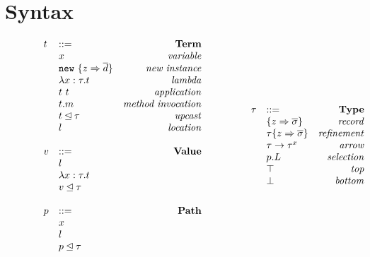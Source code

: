 \documentclass{llncs}
\numberwithin{subcase}{case}
\numberwithin{case}{theorem}
\numberwithin{case}{lemma}
\begin{document}
\section{Syntax}

\begin{figure}[h]
\[
\begin{array}{lllll}
\begin{array}{llr}
t 		& ::= 														&\text{\bf{Term}} \\
		& x 														&\text{\emph{variable}}\\
		& \texttt{new} \ \{z \Rightarrow \overline{d}\}	&\text{\emph{new instance}}\\
		& \lambda x:\tau.t 										&\text{\emph{lambda}}\\
		& t\ t 													&\text{\emph{application}}\\
		& t.m 														&\text{\emph{method invocation}}\\
		& t \unlhd \tau 										&\text{\emph{upcast}}\\
		& l  														&\text{\emph{location}}\\
&&\\
v 		& ::= 														&\text{\bf{Value}} \\
		& l 														&\\
		& \lambda x:\tau.t										&\\
		& v \unlhd \tau 										&\\
&&\\
p 		& ::= 														&\text{\bf{Path}} \\
		& x 														&\\
		& l 														&\\
		& p \unlhd \tau 										&\\
 \end{array}
& ~~~~~~
&
\begin{array}{llr}
\tau 	& ::= 														&\text{\bf{Type}} \\
		& \{z \Rightarrow \overline{\sigma}\}				&\text{\emph{record}}\\
		& \tau\{z \Rightarrow \overline{\sigma}\}			&\text{\emph{refinement}}\\
		& \tau \rightarrow \tau^x 							&\text{\emph{arrow}}\\
		& p.L 														&\text{\emph{selection}}\\
		& \top 													&\text{\emph{top}}\\
		& \bot 													&\text{\emph{bottom}}\\

\end{array}
\end{array}\]
\end{figure}
\end{document}
